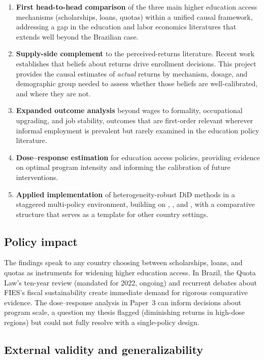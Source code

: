 \documentclass[a4paper,11pt]{article}
\begin{document}
\begin{enumerate}[nosep]
    \item \textbf{First head-to-head comparison} of the three main higher education access mechanisms (scholarships, loans, quotas) within a unified causal framework, addressing a gap in the education and labor economics literatures that extends well beyond the Brazilian case.
    \item \textbf{Supply-side complement} to the perceived-returns literature. Recent work establishes that beliefs about returns drive enrollment decisions. This project provides the causal estimates of \textit{actual} returns by mechanism, dosage, and demographic group needed to assess whether those beliefs are well-calibrated, and where they are not.
    \item \textbf{Expanded outcome analysis} beyond wages to formality, occupational upgrading, and job stability, outcomes that are first-order relevant wherever informal employment is prevalent but rarely examined in the education policy literature.
    \item \textbf{Dose--response estimation} for education access policies, providing evidence on optimal program intensity and informing the calibration of future interventions.
    \item \textbf{Applied implementation} of heterogeneity-robust DiD methods in a staggered multi-policy environment, building on \citet{callaway2021}, \citet{dechaisemartin2020}, and \citet{sun2021}, with a comparative structure that serves as a template for other country settings.
\end{enumerate}

\subsection{Policy impact}

The findings speak to any country choosing between scholarships, loans, and quotas as instruments for widening higher education access. In Brazil, the Quota Law's ten-year review (mandated for 2022, ongoing) and recurrent debates about FIES's fiscal sustainability create immediate demand for rigorous comparative evidence. The dose--response analysis in Paper~3 can inform decisions about program scale, a question my thesis flagged (diminishing returns in high-dose regions) but could not fully resolve with a single-policy design.

\subsection{External validity and generalizability}
\end{document}
